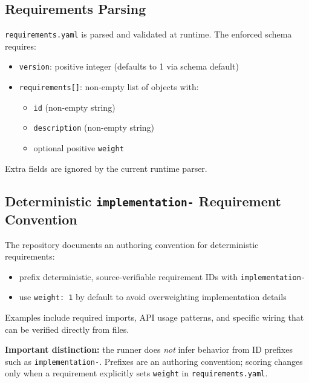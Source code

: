 \documentclass[11pt]{article}
\begin{document}
\subsection{Requirements Parsing}
\texttt{requirements.yaml} is parsed and validated at runtime. The enforced schema requires:
\begin{itemize}
  \item \texttt{version}: positive integer (defaults to 1 via schema default)
  \item \texttt{requirements[]}: non-empty list of objects with:
  \begin{itemize}
    \item \texttt{id} (non-empty string)
    \item \texttt{description} (non-empty string)
    \item optional positive \texttt{weight}
  \end{itemize}
\end{itemize}

Extra fields are ignored by the current runtime parser.

\subsection{Deterministic \texttt{implementation-} Requirement Convention}
The repository documents an authoring convention for deterministic requirements:
\begin{itemize}
  \item prefix deterministic, source-verifiable requirement IDs with \texttt{implementation-}
  \item use \texttt{weight: 1} by default to avoid overweighting implementation details
\end{itemize}

Examples include required imports, API usage patterns, and specific wiring that can be verified directly from files.

\textbf{Important distinction:} the runner does \emph{not} infer behavior from ID prefixes such as \texttt{implementation-}. Prefixes are an authoring convention; scoring changes only when a requirement explicitly sets \texttt{weight} in \texttt{requirements.yaml}.
\end{document}
